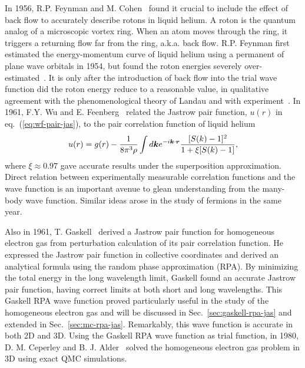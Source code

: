 In 1956, R.P. Feynman and M. Cohen~\cite{Feynman1956} found it crucial to include the effect of back flow to accurately describe rotons in liquid helium. A roton is the quantum analog of a microscopic vortex ring. When an atom moves through the ring, it triggers a returning flow far from the ring, a.k.a. back flow. R.P. Feynman first estimated the energy-momentum curve of liquid helium using a permanent of plane wave orbitals in 1954, but found the roton energies severely over-estimated~\cite{Feynman1954}. It is only after the introduction of back flow into the trial wave function did the roton energy reduce to a reasonable value, in qualitative agreement with the phenomenological theory of Landau and with experiment~\cite{Feynman1956}.
In 1961, F.Y. Wu and E. Feenberg~\cite{Wu1961} related the Jastrow pair function, $u(r)$ in eq.~(\ref{eq:wf-pair-jas}), to the pair correlation function of liquid helium
\begin{align}
u(r) = g(r) - \dfrac{1}{8\pi^3\rho}\int d\boldsymbol{k} e^{-i\boldsymbol{k}\cdot\boldsymbol{r}}
\dfrac{[S(k)-1]^2}{1+\xi[S(k)-1]},
\end{align}
where $\xi\approx0.97$ gave accurate results under the superposition approximation.
Direct relation between experimentally measurable correlation functions and the wave function is an important avenue to glean understanding from the many-body wave function.
Similar ideas arose in the study of fermions in the same year.

Also in 1961, T. Gaskell~\cite{Gaskell1961} derived a Jastrow pair function for homogeneous electron gas from perturbation calculation of its pair correlation function. He expressed the Jastrow pair function in collective coordinates and derived an analytical formula using the random phase approximation (RPA). By minimizing the total energy in the long wavelength limit, Gaskell found an accurate Jastrow pair function, having correct limits at both short and long wavelengths.
This Gaskell RPA wave function proved particularly useful in the study of the homogeneous electron gas and will be discussed in Sec.~\ref{sec:gaskell-rpa-jas} and extended in Sec.~\ref{sec:mc-rpa-jas}.
Remarkably, this wave function is accurate in both 2D and 3D.
Using the Gaskell RPA wave function as trial function, in 1980, D. M. Ceperley and B. J. Alder~\cite{Ceperley1980} solved the homogeneous electron gas problem in 3D using exact QMC simulations.

